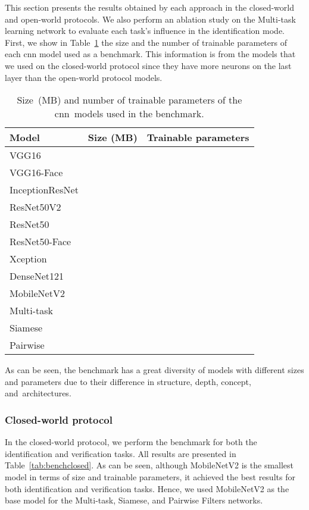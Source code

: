 \documentclass[journal]{IEEEtran}
\begin{document}
This section presents the results obtained by each approach in the closed-world and open-world protocols.
We also perform an ablation study on the Multi-task learning network to evaluate each task's influence in the identification mode.
First, we show in Table~\ref{tab:modelstats} the size and the number of trainable parameters of each \gls{cnn} model used as a benchmark.
This information is from the models that we used on the closed-world protocol since they have more neurons on the last layer than the open-world protocol models.

\begin{table}[!ht]
\centering
\caption{Size~(MB) and number of trainable parameters of the \gls{cnn}~models used in the benchmark.}
\label{tab:modelstats}

\vspace{-1.5mm}

\begin{tabular}{@{}lrr@{}}
\toprule

Model              & Size (MB)       & Trainable parameters   \\


\midrule
VGG16              &   &   \\
VGG16-Face         &   &   \\ 
InceptionResNet    &    &   \\
ResNet50V2         &    &   \\
ResNet50           &    &   \\
ResNet50-Face      &    &   \\
Xception           &    &   \\
DenseNet121        &     &   \\
MobileNetV2        &     &   \\
\midrule
Multi-task         &     &   \\
\midrule
Siamese            &     &   \\
Pairwise           &     &   \\
\bottomrule
\end{tabular}
\end{table}

As can be seen, the benchmark has a great diversity of models with different sizes and parameters due to their difference in structure, depth, concept, and~architectures. 

\subsubsection{Closed-world protocol}
\label{sec:closed}
In the closed-world protocol, we perform the benchmark for both the identification and verification tasks.
All results are presented in Table~\ref{tab:benchclosed}.
As can be seen, although MobileNetV2 is the smallest model in terms of size and trainable parameters, it achieved the best results for both identification and verification tasks.
Hence, we used MobileNetV2 as the base model for the Multi-task, Siamese, and Pairwise Filters networks.
\end{document}
